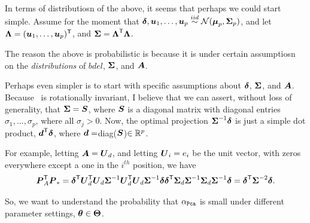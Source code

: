 \documentclass[10pt]{article}
\begin{document}
In terms of distributiosn of the above, it seems that perhaps we could start simple.
Assume for the moment that $\boldsymbol{\delta},\boldsymbol{u}_1,\ldots,\boldsymbol{u}_p \overset{iid}{\sim} \mathcal{N}(\boldsymbol{\mu}_p, \boldsymbol{\Sigma}_p)$, and let $\boldsymbol{\Lambda}=(\boldsymbol{u}_1,\ldots,\boldsymbol{u}_p)^{\mathsf{T}}$, and $\boldsymbol{\Sigma} = \boldsymbol{\Lambda}^{\mathsf{T}} \boldsymbol{\Lambda}$.  

The reason the above is probabilistic is because it is under certain assumptiosn on the \emph{distributions} of $bdel$, $\boldsymbol{\Sigma}$, and $\boldsymbol{A}$.   


Perhaps even simpler is to start with specific assumptions about $\boldsymbol{\delta}$, $\boldsymbol{\Sigma}$, and $\boldsymbol{A}$. Because \Lda~is rotationally invariant, I believe that we can assert, without loss of generality, that $\boldsymbol{\Sigma}=\boldsymbol{S}$, where $\boldsymbol{S}$ is a diagonal matrix with diagonal entries $\sigma_1,\ldots, \sigma_p$, where all $\sigma_j > 0$.
Now, the optimal projection $\boldsymbol{\Sigma}^{-1} \boldsymbol{\delta}$ is just a simple dot product,  $\boldsymbol{d}^{\mathsf{T}} \boldsymbol{\delta}$, where $\boldsymbol{d}=$diag($\boldsymbol{S}$)$\in \mathbb{R}^p$.


For example, letting $\boldsymbol{A}=\boldsymbol{U}_d$, and letting $\boldsymbol{U}_i=e_i$ be the unit vector, with zeros everywhere except a one in the $i^{th}$ position,  we have
\begin{align*}
\bP_A\T \bP_* %
= \bdel\T \bU_d\T \bU_d \bSig^{-1} \bU_d\T \bU_d \bSig^{-1} \bdel %
\bdel\T \bSig_d \bSig^{-1} \bSig_d \bSig^{-1} \bdel %
= \bdel\T \bSig^{-2} \bdel.
\end{align*}






So, we want to understand the probability that $\alpha_{{\sc \texttt{Pca}}}$ is small under different parameter settings, $\boldsymbol{\theta} \in \boldsymbol{\Theta}$.  





\clearpage


\end{document}
